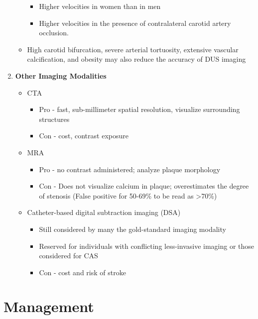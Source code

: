 \documentclass[
]{book}
\begin{document}
\begin{enumerate}
\begin{itemize}
    \begin{itemize}
    \item
      Higher velocities in women than in men
    \item
      Higher velocities in the presence of contralateral carotid
      artery occlusion.
    \end{itemize}
  \item
    High carotid bifurcation, severe arterial tortuosity, extensive
    vascular calcification, and obesity may also reduce the accuracy
    of DUS imaging
  \end{itemize}
\item
  \textbf{Other Imaging Modalities}

  \begin{itemize}
  \item
    CTA

    \begin{itemize}
    \item
      Pro - fast, sub-millimeter spatial resolution, visualize
      surrounding structures
    \item
      Con - cost, contrast exposure
    \end{itemize}
  \item
    MRA

    \begin{itemize}
    \item
      Pro - no contrast administered; analyze plaque morphology
    \item
      Con - Does not visualize calcium in plaque; overestimates
      the degree of stenosis (False positive for 50-69\% to be read
      as \textgreater70\%)
    \end{itemize}
  \item
    Catheter-based digital subtraction imaging (DSA)

    \begin{itemize}
    \item
      Still considered by many the gold-standard imaging modality
    \item
      Reserved for individuals with conflicting less-invasive
      imaging or those considered for CAS
    \item
      Con - cost and risk of stroke
    \end{itemize}
  \end{itemize}
\end{enumerate}

\hypertarget{management}{%
\section{Management}\label{management}}
\end{document}
